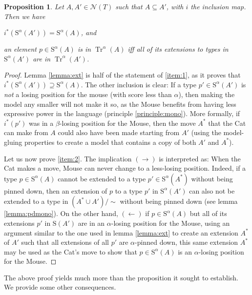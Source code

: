 \documentclass{article}
\newtheorem{prop}[theorem]{Proposition}
\theoremstyle{nonumberplain}
\newtheorem{proof}{Proof}
\newcommand{\calN}{\mathcal{N}}
\newcommand{\Stone}{\mathrm{S}}
\DeclareMathOperator{\Tr}{Tr}
\begin{document}
\begin{prop}\label{prop:istone}
Let $A, A' \in \calN(T)$ such that $A \subseteq A'$, with $i$ the inclusion map. Then we have \begin{enumerate*} \item\label{item:1} $i^*(\Stone^\alpha(A')) = \Stone^\alpha(A)$, and \item\label{item:2} an element $p \in \Stone^\alpha(A)$ is in $\Tr^\alpha(A)$ iff all of its extensions to types in $\Stone^\alpha(A')$ are in $\Tr^\alpha(A')$.\end{enumerate*}
\end{prop}

\begin{proof}
Lemma \ref{lemma:ext} is half of the statement of \ref{item:1}, as it proves that $i^*(\Stone^\alpha(A')) \supseteq \Stone^\alpha(A)$. The other inclusion is clear: If a type $p' \in \Stone^\alpha(A')$ is \emph{not} a losing position for the mouse (with score less than $\alpha$), then making the model any smaller will not make it so, as the Mouse benefits from having less expressive power in the language (principle \ref{principle:mono}). More formally, if $i^*(p')$ was in a $\beta$-losing position for the Mouse, then the move $A^*$ that the Cat can make from $A$ could also have been made starting from $A'$ (using the model-gluing properties to create a model that contains a copy of both $A'$ and $A^*$).

Let us now prove \ref{item:2}. The implication $(\rightarrow)$ is interpreted as: When the Cat makes a move, Mouse can never change to a less-losing position. Indeed, if a type $p \in \Stone^\alpha(A)$ cannot be extended to a type $p' \in \Stone^\alpha(A^*)$ without being pinned down, then an extension of $p$ to a type $p'$ in $\Stone^\alpha(A')$ can also not be extended to a type in $(A^* \cup A')/\sim$ without being pinned down (see lemma \ref{lemma:pdmono}). On the other hand, $(\leftarrow)$ if $p \in \Stone^\alpha(A)$ but all of its extensions $p'$ in $\Stone(A')$ are in an $\alpha$-losing position for the Mouse, using an argument similar to the one used in lemma \ref{lemma:ext} to create an extension $A^*$ of $A'$ such that all extensions of all $p'$ are $\alpha$-pinned down, this same extension $A^*$ may be used as the Cat's move to show that $p \in \Stone^\alpha(A)$ is an $\alpha$-losing position for the Mouse.
\end{proof}

The above proof yields much more than the proposition it sought to establish. We provide some other consequences.
\end{document}
